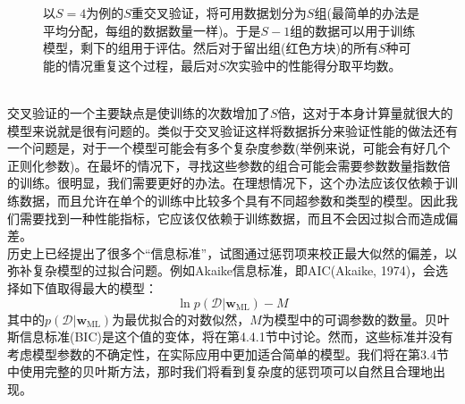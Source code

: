 \documentclass[b5paper]{book}
\numberwithin{equation}{chapter}
\begin{document}
{\begin{figure}[ht]
		\caption{以$S=4$为例的$S$重交叉验证，将可用数据划分为$S$组(最简单的办法是平均分配，每组的数据数量一样)。于是$S-1$组的数据可以用于训练模型，剩下的组用于评估。然后对于留出组(红色方块)的所有$S$种可能的情况重复这个过程，最后对$S$次实验中的性能得分取平均数。}
		\label{fig:1-18}
	\end{figure}
	\\
	\indent 交叉验证的一个主要缺点是使训练的次数增加了$S$倍，这对于本身计算量就很大的模型来说就是很有问题的。类似于交叉验证这样将数据拆分来验证性能的做法还有一个问题是，对于一个模型可能会有多个复杂度参数(举例来说，可能会有好几个正则化参数)。在最坏的情况下，寻找这些参数的组合可能会需要参数数量指数倍的训练。很明显，我们需要更好的办法。在理想情况下，这个办法应该仅依赖于训练数据，而且允许在单个的训练中比较多个具有不同超参数和类型的模型。因此我们需要找到一种性能指标，它应该仅依赖于训练数据，而且不会因过拟合而造成偏差。\\
	\indent 历史上已经提出了很多个“信息标准”，试图通过惩罚项来校正最大似然的偏差，以弥补复杂模型的过拟合问题。例如Akaike信息标准，即AIC(Akaike, 1974)，会选择如下值取得最大的模型：
	\begin{equation}
		\ln p(\mathcal{D}|\mathbf{w}_{\mathrm{ML}}) -M
	\end{equation}
	\indent 其中的$p(\mathcal{D}|\mathbf{w}_{\mathrm{ML}})$为最优拟合的对数似然，$M$为模型中的可调参数的数量。贝叶斯信息标准(BIC)是这个值的变体，将在第4.4.1节中讨论。然而，这些标准并没有考虑模型参数的不确定性，在实际应用中更加适合简单的模型。我们将在第3.4节中使用完整的贝叶斯方法，那时我们将看到复杂度的惩罚项可以自然且合理地出现。
	}
\end{document}
